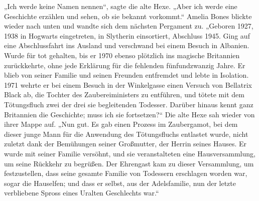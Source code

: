 „Ich werde keine Namen nennen“, sagte die alte Hexe. „Aber ich werde eine Geschichte erzählen und sehen, ob sie bekannt vorkommt.“
Amelia Bones blickte wieder nach unten und wandte sich dem nächsten Pergament zu. „Geboren 1927, 1938 in Hogwarts eingetreten, in Slytherin einsortiert, Abschluss 1945. Ging auf eine Abschlussfahrt ins Ausland und verschwand bei einem Besuch in Albanien. Wurde für tot gehalten, bis er 1970 ebenso plötzlich ins magische Britannien zurückkehrte, ohne jede Erklärung für die fehlenden fünfundzwanzig Jahre. Er blieb von seiner Familie und seinen Freunden entfremdet und lebte in Isolation. 1971 wehrte er bei einem Besuch in der Winkelgasse einen Versuch von Bellatrix Black ab, die Tochter des Zaubereiministers zu entführen, und tötete mit dem Tötungsfluch zwei der drei sie begleitenden Todesser. Darüber hinaus kennt ganz Britannien die Geschichte; muss ich sie fortsetzen?“
Die alte Hexe sah wieder von ihrer Mappe auf.
„Nun gut. Es gab einen Prozess im Zaubergamot, bei dem dieser junge Mann für die Anwendung des Tötungsfluchs entlastet wurde, nicht zuletzt dank der Bemühungen seiner Großmutter, der Herrin seines Hauses. Er wurde mit seiner Familie versöhnt, und sie veranstalteten eine Hausversammlung, um seine Rückkehr zu begrüßen. Der Ehrengast kam zu dieser Versammlung, um festzustellen, dass seine gesamte Familie von Todessern erschlagen worden war, sogar die Hauselfen; und dass er selbst, aus der Adelsfamilie, nun der letzte verbliebene Spross eines Uralten Geschlechts war.“

